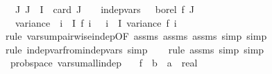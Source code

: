 \begin{isabellebody}
\ \ \ {\isachardoublequoteopen}{\isasymAnd}J{\isachardot}{\kern0pt}\ J\ {\isasymsubseteq}\ I\ {\isasymLongrightarrow}\ card\ J\ {\isacharequal}{\kern0pt}\ {}\ {\isasymLongrightarrow}\ indep{\isacharunderscore}{\kern0pt}vars\ {\isacharparenleft}{\kern0pt}{\isasymlambda}\ {\isacharunderscore}{\kern0pt}{\isachardot}{\kern0pt}\ borel{\isacharparenright}{\kern0pt}\ f\ J{\isachardoublequoteclose}\isanewline
\ \ \ {\isachardoublequoteopen}variance\ {\isacharparenleft}{\kern0pt}{\isasymlambda}{\isasymomega}{\isachardot}{\kern0pt}\ {\isacharparenleft}{\kern0pt}{\isasymSum}i\ {\isasymin}\ I{\isachardot}{\kern0pt}\ f\ i\ {\isasymomega}{\isacharparenright}{\kern0pt}{\isacharparenright}{\kern0pt}\ {\isacharequal}{\kern0pt}\ {\isacharparenleft}{\kern0pt}{\isasymSum}i\ {\isasymin}\ I{\isachardot}{\kern0pt}\ variance\ {\isacharparenleft}{\kern0pt}f\ i{\isacharparenright}{\kern0pt}{\isacharparenright}{\kern0pt}{\isachardoublequoteclose}\isanewline
%
\isadelimproof
\ \ %
\endisadelimproof
%
\isatagproof
{}\isamarkupfalse%
\ {\isacharparenleft}{\kern0pt}rule\ var{\isacharunderscore}{\kern0pt}sum{\isacharunderscore}{\kern0pt}pairwise{\isacharunderscore}{\kern0pt}indep{\isacharbrackleft}{\kern0pt}OF\ assms{\isacharparenleft}{\kern0pt}{}{\isacharparenright}{\kern0pt}\ assms{\isacharparenleft}{\kern0pt}{}{\isacharparenright}{\kern0pt}\ assms{\isacharparenleft}{\kern0pt}{}{\isacharparenright}{\kern0pt}{\isacharbrackright}{\kern0pt}{\isacharcomma}{\kern0pt}\ simp{\isacharcomma}{\kern0pt}\ simp{\isacharparenright}{\kern0pt}\isanewline
\ \ \isamarkupfalse%
\ {\isacharparenleft}{\kern0pt}rule\ indep{\isacharunderscore}{\kern0pt}var{\isacharunderscore}{\kern0pt}from{\isacharunderscore}{\kern0pt}indep{\isacharunderscore}{\kern0pt}vars{\isacharcomma}{\kern0pt}\ simp{\isacharparenright}{\kern0pt}\isanewline
\ \ \isamarkupfalse%
\ {\isacharparenleft}{\kern0pt}rule\ assms{\isacharparenleft}{\kern0pt}{}{\isacharparenright}{\kern0pt}{\isacharcomma}{\kern0pt}\ simp{\isacharcomma}{\kern0pt}\ simp{\isacharparenright}{\kern0pt}%
\endisatagproof
{\isafoldproof}%
%
\isadelimproof
\isanewline
%
\endisadelimproof
\isanewline
{}\isamarkupfalse%
\ {\isacharparenleft}{\kern0pt}\ prob{\isacharunderscore}{\kern0pt}space{\isacharparenright}{\kern0pt}\ var{\isacharunderscore}{\kern0pt}sum{\isacharunderscore}{\kern0pt}all{\isacharunderscore}{\kern0pt}indep{\isacharcolon}{\kern0pt}\isanewline
\ \ \ f\ {\isacharcolon}{\kern0pt}{\isacharcolon}{\kern0pt}\ {\isachardoublequoteopen}{\isacharprime}{\kern0pt}b\ {\isasymRightarrow}\ {\isacharprime}{\kern0pt}a\ {\isasymRightarrow}\ real{\isachardoublequoteclose}\isanewline

\end{isabellebody}
